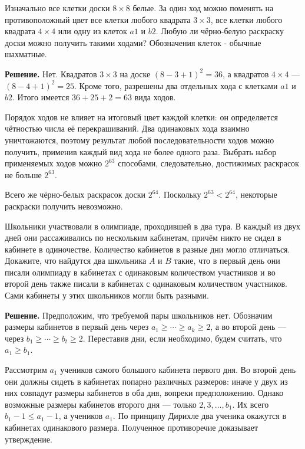 \begin{problems}
\item Изначально все клетки доски $8\times8$ белые. За один ход можно поменять на противоположный цвет все клетки любого квадрата $3\times3$, все клетки любого квадрата $4\times4$ или одну из клеток $a1$ и $b2$. Любую ли чёрно-белую раскраску доски можно получить такими ходами? Обозначения клеток - обычные шахматные.
\par\smallskip\noindent\textbf{Решение.} Нет. Квадратов $3\times3$ на доске $(8-3+1)^2=36$, а квадратов $4\times4$ --- $(8-4+1)^2=25$. Кроме того, разрешены два отдельных хода с клетками $a1$ и $b2$. Итого имеется $36+25+2=63$ вида ходов.
\par Порядок ходов не влияет на итоговый цвет каждой клетки: он определяется чётностью числа её перекрашиваний. Два одинаковых хода взаимно уничтожаются, поэтому результат любой последовательности ходов можно получить, применив каждый вид хода не более одного раза. Выбрать набор применяемых ходов можно $2^{63}$ способами, следовательно, достижимых раскрасок не больше $2^{63}$.
\par Всего же чёрно-белых раскрасок доски $2^{64}$. Поскольку $2^{63}<2^{64}$, некоторые раскраски получить невозможно.\par

\item Школьники участвовали в олимпиаде, проходившей в два тура. В каждый из двух дней они рассаживались по нескольким кабинетам, причём никто не сидел в кабинете в одиночестве. Количество кабинетов в разные дни могло отличаться. Докажите, что найдутся два школьника $A$ и $B$ такие, что в первый день они писали олимпиаду в кабинетах с одинаковым количеством участников и во второй день также писали в кабинетах с одинаковым количеством участников. Сами кабинеты у этих школьников могли быть разными.
\par\smallskip\noindent\textbf{Решение.} Предположим, что требуемой пары школьников нет. Обозначим размеры кабинетов в первый день через $a_1\ge\cdots\ge a_k\ge2$, а во второй день --- через $b_1\ge\cdots\ge b_t\ge2$. Переставив дни, если необходимо, будем считать, что $a_1\ge b_1$.
\par Рассмотрим $a_1$ учеников самого большого кабинета первого дня. Во второй день они должны сидеть в кабинетах попарно различных размеров: иначе у двух из них совпадут размеры кабинетов в оба дня, вопреки предположению. Однако возможные размеры кабинетов второго дня --- только $2,3,\ldots,b_1$. Их всего $b_1-1\le a_1-1$, а учеников $a_1$. По принципу Дирихле два ученика окажутся в кабинетах одинакового размера. Полученное противоречие доказывает утверждение.\par


\end{problems}

